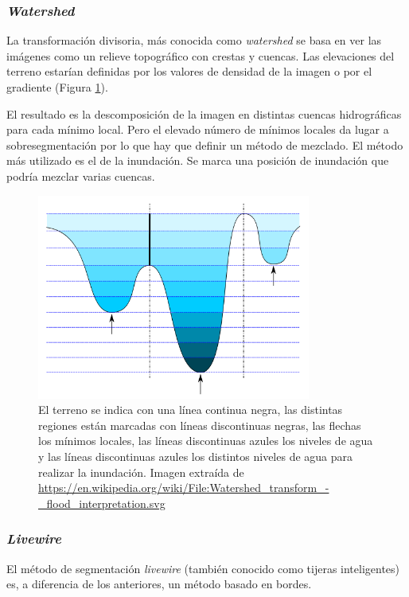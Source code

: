 \subsubsection{\textit{Watershed}}

La transformación divisoria, más conocida como \textit{watershed} se basa en ver las imágenes como un relieve topográfico con crestas y cuencas. Las elevaciones del terreno estarían definidas por los valores de densidad de la imagen o por el gradiente \cite{beucher79} (Figura \ref{fig:desarrollo/watershed}). 

El resultado es la descomposición de la imagen en distintas cuencas hidrográficas para cada mínimo local. Pero el elevado número de mínimos locales da lugar a sobresegmentación por lo que hay que definir un método de mezclado. El método más utilizado es el de la inundación. Se marca una posición de inundación que podría mezclar varias cuencas.

\begin{figure}[H]
	\centering
	\includegraphics[width=9cm]{imagenes/desarrollo/watershed}
	\caption{El terreno se indica con una línea continua negra, las distintas regiones están marcadas con líneas discontinuas negras, las flechas los mínimos locales, las líneas discontinuas azules los niveles de agua y las líneas discontinuas azules los distintos niveles de agua para realizar la inundación. Imagen extraída de \url{https://en.wikipedia.org/wiki/File:Watershed_transform_-_flood_interpretation.svg}}
	\label{fig:desarrollo/watershed}
\end{figure}

\subsubsection{\textit{Livewire}}

El método de segmentación \textit{livewire} (también conocido como tijeras inteligentes) es, a diferencia de los anteriores, un método basado en bordes.

